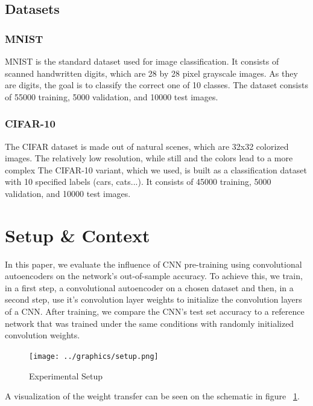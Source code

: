 \documentclass{article}
\begin{document}
\subsection{Datasets}
  \subsubsection{MNIST}
    MNIST \citep{lecun1998mnist} is the standard dataset used for image classification. It consists of scanned handwritten digits, which are 28 by 28 pixel grayscale images. As they are digits, the goal is to classify the correct one of 10 classes.
    The dataset consists of 55000 training, 5000 validation, and 10000 test images.
  \subsubsection{CIFAR-10}
    The CIFAR dataset \citep{krizhevsky2009learning} is made out of natural scenes, which are 32x32 colorized images. The relatively low resolution, while still and the colors lead to a more complex
    The CIFAR-10 variant, which we used, is built as a classification dataset with 10 specified labels (cars, cats...).
    It consists of 45000 training, 5000 validation, and 10000 test images.

\section{Setup \& Context}

  In this paper, we evaluate the influence of CNN pre-training using convolutional autoencoders on the network's out-of-sample accuracy. To achieve this, we train, in a first step, a convolutional autoencoder on a chosen dataset and then, in a second step, use it's convolution layer weights to initialize the convolution layers of a CNN. After training, we compare the CNN's test set accuracy to a reference network that was trained under the same conditions with randomly initialized convolution weights. 

  \begin{figure}[h]
    \centering
    \texttt{[image: ../graphics/setup.png]}
    \caption{Experimental Setup}
    \label{fig:experimental_setup}
  \end{figure}

  A visualization of the weight transfer can be seen on the schematic in figure ~\ref{fig:experimental_setup}. 
\end{document}
